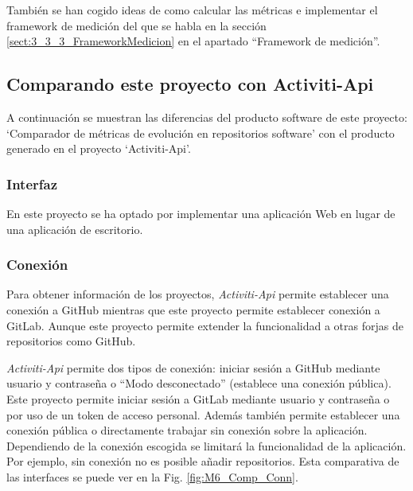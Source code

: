 
También se han cogido ideas de como calcular las métricas e implementar el framework de medición del que se habla en la sección \ref{sect:3_3_3_FrameworkMedicion} en el apartado ``Framework de medición''.

\subsection{Comparando este proyecto con Activiti-Api}

A continuación se muestran las diferencias del producto software de este proyecto: `Comparador de métricas de evolución en repositorios software' con el producto generado en el proyecto `Activiti-Api'.

\subsubsection{Interfaz}

En este proyecto se ha optado por implementar una aplicación Web en lugar de una aplicación de escritorio.

\subsubsection{Conexión}

Para obtener información de los proyectos, \textit{Activiti-Api} permite establecer una conexión a GitHub mientras que este proyecto permite establecer conexión a GitLab. Aunque este proyecto permite extender la funcionalidad a otras forjas de repositorios como GitHub.

\textit{Activiti-Api} permite dos tipos de conexión: iniciar sesión a GitHub mediante usuario y contraseña o ``Modo desconectado'' (establece una conexión pública). Este proyecto permite iniciar sesión a GitLab mediante usuario y contraseña o por uso de un token de acceso personal. Además también permite establecer una conexión pública o directamente trabajar sin conexión sobre la aplicación. Dependiendo de la conexión escogida se limitará la funcionalidad de la aplicación. Por ejemplo, sin conexión no es posible añadir repositorios. Esta comparativa de las interfaces se puede ver en la Fig. \ref{fig:M6_Comp_Conn}.

